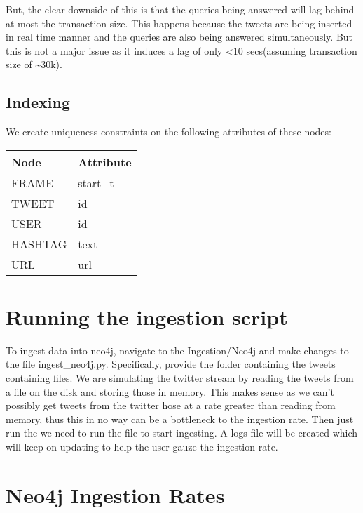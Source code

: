 \documentclass[letterpaper,10pt,english]{sphinxmanual}
\begin{document}
But, the clear downside of this is that the queries being answered will lag behind at most the transaction size. This happens because the tweets are being inserted in real time manner and the queries are also being answered simultaneously. But this is not a major issue as it induces a lag of only \textless{}10 secs(assuming transaction size of \textasciitilde{}30k).


\subsection{Indexing}
\label{\detokenize{neo4j_data_ingestion:indexing}}
We create uniqueness constraints on the following attributes of these nodes:


\begin{savenotes}\sphinxattablestart
\centering
\begin{tabulary}{\linewidth}[t]{|T|T|}
\hline
\sphinxstyletheadfamily 
Node
&\sphinxstyletheadfamily 
Attribute
\\
\hline
FRAME
&
start\_t
\\
\hline
TWEET
&
id
\\
\hline
USER
&
id
\\
\hline
HASHTAG
&
text
\\
\hline
URL
&
url
\\
\hline
\end{tabulary}
\par
\sphinxattableend\end{savenotes}


\section{Running the ingestion script}
\label{\detokenize{neo4j_data_ingestion:running-the-ingestion-script}}
To ingest data into neo4j, navigate to the Ingestion/Neo4j and make changes to the file ingest\_neo4j.py. Specifically, provide the folder containing the tweets containing files. We are simulating the twitter stream by reading the tweets from a file on the disk and storing those in memory. This makes sense as we can’t possibly get tweets from the twitter hose at a rate greater than reading from memory, thus this in no way can be a bottleneck to the ingestion rate. Then just run the we need to run the file  to start ingesting. A logs file will be created which will keep on updating to help the user gauze the ingestion rate.


\section{Neo4j Ingestion Rates}
\label{\detokenize{neo4j_data_ingestion:neo4j-ingestion-rates}}
\noindent{}
\end{document}
